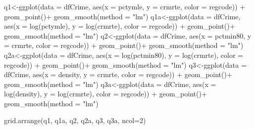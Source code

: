 \documentclass[]{article}
\newenvironment{Shaded}{}{}
\newcommand{\DataTypeTok}[1]{#1}
\newcommand{\DecValTok}[1]{#1}
\newcommand{\KeywordTok}[1]{\textcolor[rgb]{0.00,0.00,1.00}{#1}}
\newcommand{\NormalTok}[1]{#1}
\newcommand{\OperatorTok}[1]{#1}
\newcommand{\StringTok}[1]{\textcolor[rgb]{0.00,0.50,0.50}{#1}}
\begin{document}
\begin{Shaded}
\begin{Highlighting}[]
\NormalTok{q1<-}\KeywordTok{ggplot}\NormalTok{(}\DataTypeTok{data =}\NormalTok{ dfCrime, }\KeywordTok{aes}\NormalTok{(}\DataTypeTok{x =}\NormalTok{ pctymle, }\DataTypeTok{y =}\NormalTok{ crmrte, }\DataTypeTok{color =}\NormalTok{ regcode)) }\OperatorTok{+}\StringTok{ }
\StringTok{      }\KeywordTok{geom_point}\NormalTok{()}\OperatorTok{+}
\StringTok{  }\KeywordTok{geom_smooth}\NormalTok{(}\DataTypeTok{method =} \StringTok{"lm"}\NormalTok{)}
\NormalTok{q1a<-}\KeywordTok{ggplot}\NormalTok{(}\DataTypeTok{data =}\NormalTok{ dfCrime, }\KeywordTok{aes}\NormalTok{(}\DataTypeTok{x =} \KeywordTok{log}\NormalTok{(pctymle), }\DataTypeTok{y =} \KeywordTok{log}\NormalTok{(crmrte), }\DataTypeTok{color =}\NormalTok{ regcode)) }\OperatorTok{+}\StringTok{ }
\StringTok{      }\KeywordTok{geom_point}\NormalTok{()}\OperatorTok{+}
\StringTok{  }\KeywordTok{geom_smooth}\NormalTok{(}\DataTypeTok{method =} \StringTok{"lm"}\NormalTok{)}
\NormalTok{q2<-}\KeywordTok{ggplot}\NormalTok{(}\DataTypeTok{data =}\NormalTok{ dfCrime, }\KeywordTok{aes}\NormalTok{(}\DataTypeTok{x =}\NormalTok{ pctmin80, }\DataTypeTok{y =}\NormalTok{ crmrte, }\DataTypeTok{color =}\NormalTok{ regcode)) }\OperatorTok{+}\StringTok{ }
\StringTok{      }\KeywordTok{geom_point}\NormalTok{()}\OperatorTok{+}
\StringTok{  }\KeywordTok{geom_smooth}\NormalTok{(}\DataTypeTok{method =} \StringTok{"lm"}\NormalTok{)}
\NormalTok{q2a<-}\KeywordTok{ggplot}\NormalTok{(}\DataTypeTok{data =}\NormalTok{ dfCrime, }\KeywordTok{aes}\NormalTok{(}\DataTypeTok{x =} \KeywordTok{log}\NormalTok{(pctmin80), }\DataTypeTok{y =} \KeywordTok{log}\NormalTok{(crmrte), }\DataTypeTok{color =}\NormalTok{ regcode)) }\OperatorTok{+}\StringTok{ }
\StringTok{      }\KeywordTok{geom_point}\NormalTok{()}\OperatorTok{+}
\StringTok{  }\KeywordTok{geom_smooth}\NormalTok{(}\DataTypeTok{method =} \StringTok{"lm"}\NormalTok{)}
\NormalTok{q3<-}\KeywordTok{ggplot}\NormalTok{(}\DataTypeTok{data =}\NormalTok{ dfCrime, }\KeywordTok{aes}\NormalTok{(}\DataTypeTok{x =}\NormalTok{ density, }\DataTypeTok{y =}\NormalTok{ crmrte, }\DataTypeTok{color =}\NormalTok{ regcode)) }\OperatorTok{+}\StringTok{ }
\StringTok{      }\KeywordTok{geom_point}\NormalTok{()}\OperatorTok{+}
\StringTok{  }\KeywordTok{geom_smooth}\NormalTok{(}\DataTypeTok{method =} \StringTok{"lm"}\NormalTok{)}
\NormalTok{q3a<-}\KeywordTok{ggplot}\NormalTok{(}\DataTypeTok{data =}\NormalTok{ dfCrime, }\KeywordTok{aes}\NormalTok{(}\DataTypeTok{x =} \KeywordTok{log}\NormalTok{(density), }\DataTypeTok{y =} \KeywordTok{log}\NormalTok{(crmrte), }\DataTypeTok{color =}\NormalTok{ regcode)) }\OperatorTok{+}\StringTok{ }
\StringTok{      }\KeywordTok{geom_point}\NormalTok{()}\OperatorTok{+}
\StringTok{  }\KeywordTok{geom_smooth}\NormalTok{(}\DataTypeTok{method =} \StringTok{"lm"}\NormalTok{)}


\KeywordTok{grid.arrange}\NormalTok{(q1, q1a, q2, q2a, q3, q3a, }\DataTypeTok{ncol=}\DecValTok{2}\NormalTok{)}
\end{Highlighting}
\end{Shaded}
\end{document}
